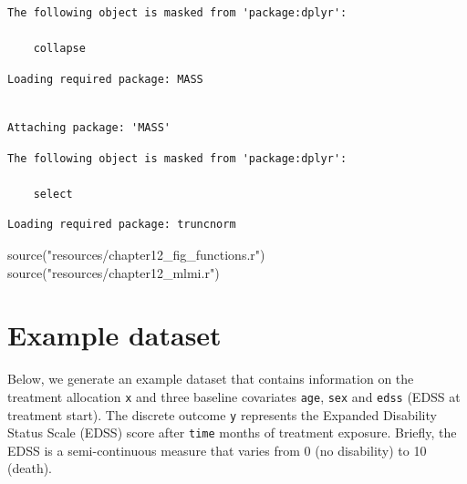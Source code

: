 \documentclass[
  letterpaper,
  DIV=11,
  numbers=noendperiod]{scrreprt}
\newenvironment{Shaded}{\begin{snugshade}}{\end{snugshade}}
\newcommand{\FunctionTok}[1]{\textcolor[rgb]{0.28,0.35,0.67}{#1}}
\newcommand{\NormalTok}[1]{\textcolor[rgb]{0.00,0.23,0.31}{#1}}
\newcommand{\StringTok}[1]{\textcolor[rgb]{0.13,0.47,0.30}{#1}}
\begin{document}
\begin{verbatim}
The following object is masked from 'package:dplyr':

    collapse
\end{verbatim}

\begin{verbatim}
Loading required package: MASS
\end{verbatim}

\begin{verbatim}

Attaching package: 'MASS'
\end{verbatim}

\begin{verbatim}
The following object is masked from 'package:dplyr':

    select
\end{verbatim}

\begin{verbatim}
Loading required package: truncnorm
\end{verbatim}

\begin{Shaded}
\begin{Highlighting}[]
\FunctionTok{source}\NormalTok{(}\StringTok{"resources/chapter12\_fig\_functions.r"}\NormalTok{)}
\FunctionTok{source}\NormalTok{(}\StringTok{"resources/chapter12\_mlmi.r"}\NormalTok{)}
\end{Highlighting}
\end{Shaded}

\hypertarget{example-dataset}{%
\section{Example dataset}\label{example-dataset}}

Below, we generate an example dataset that contains information on the
treatment allocation \texttt{x} and three baseline covariates
\texttt{age}, \texttt{sex} and \texttt{edss} (EDSS at treatment start).
The discrete outcome \texttt{y} represents the Expanded Disability
Status Scale (EDSS) score after \texttt{time} months of treatment
exposure. Briefly, the EDSS is a semi-continuous measure that varies
from 0 (no disability) to 10 (death).
\end{document}
